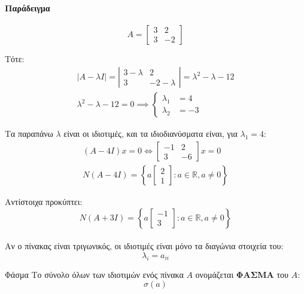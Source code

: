 \documentclass[11pt,a4paper,notitlepage,fleqn,final]{article}
\begin{document}
    \paragraph{Παράδειγμα}
    \[
    A = \left[\begin{matrix}
    3&2\\3&-2
    \end{matrix}\right]
    \]

    Τότε:
    \begin{gather*}
    	|A-\lambda I| = \left|\begin{matrix}
    	3-\lambda & 2 \\ 3 & -2-\lambda
    	\end{matrix}\right| = \lambda^2 -\lambda-12 \\
    	\lambda^2-\lambda-12 = 0 \implies\begin{cases}
    	\lambda_1 &= 4 \\ \lambda_2&=-3
    	\end{cases}
    \end{gather*}

    Τα παραπάνω \( \lambda \) είναι οι ιδιοτιμές, και τα ιδιοδιανύσματα
    είναι, για \( \lambda_1 = 4 \):
    \begin{gather*}
    	(A-4I)x = 0 \iff \left[\begin{matrix}
    	-1&2\\3&-6
    	\end{matrix}\right]x = 0 \\ N(A-4I)= \left\lbrace
    	a\left[\begin{matrix}
    	2\\1
    	\end{matrix}\right]: a \in\mathbb R, a\neq 0
    	 \right\rbrace
    \end{gather*}

    Αντίστοιχα προκύπτει:
    \[
    N(A+3I) = \left\lbrace a\left[
    \begin{matrix}
    -1\\3
    \end{matrix}
    \right] : a \in\mathbb R, a\neq 0 \right\rbrace
    \]

    \paragraph{}
    Αν ο πίνακας είναι τριγωνικός, οι ιδιοτιμές είναι μόνο τα διαγώνια
    στοιχεία του:
    \[
    \lambda_i = a_{ii}
    \]

    \begin{defn}{Φάσμα}{}
    	Το σύνολο όλων των ιδιοτιμών ενός πίνακα \( A \) ονομάζεται
    	\textbf{ΦΑΣΜΑ} του \( A \):
    	\[
    	\sigma(a)
    	\]
    \end{defn}
\end{document}
